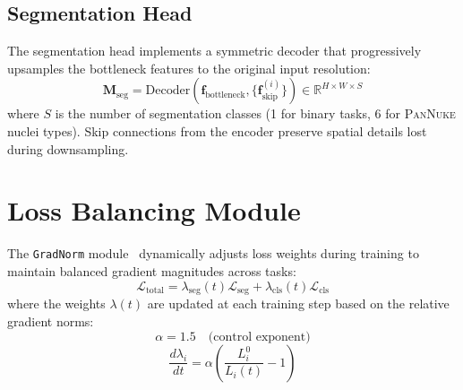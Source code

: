\documentclass[11pt,a4paper,twoside]{report}
\newcommand{\dataset}[1]{\textsc{#1}}
\newcommand{\model}[1]{\texttt{#1}}
\begin{document}
\subsection{Segmentation Head}

The segmentation head implements a symmetric decoder that progressively upsamples the bottleneck features to the original input resolution:
\begin{equation}
\mathbf{M}_{\text{seg}} = \text{Decoder}(\mathbf{f}_{\text{bottleneck}}, \{\mathbf{f}_{\text{skip}}^{(i)}\}) \in \mathbb{R}^{H \times W \times S}
\end{equation}
where $S$ is the number of segmentation classes (1 for binary tasks, 6 for \dataset{PanNuke} nuclei types). Skip connections from the encoder preserve spatial details lost during downsampling.

\section{Loss Balancing Module}

The \model{GradNorm} module~\cite{ding2024gradnorm} dynamically adjusts loss weights during training to maintain balanced gradient magnitudes across tasks:
\begin{equation}
\mathcal{L}_{\text{total}} = \lambda_{\text{seg}}(t) \mathcal{L}_{\text{seg}} + \lambda_{\text{cls}}(t) \mathcal{L}_{\text{cls}}
\end{equation}
where the weights $\lambda(t)$ are updated at each training step based on the relative gradient norms:
\begin{equation}
\alpha = 1.5 \quad \text{(control exponent)}
\end{equation}
\begin{equation}
\frac{d\lambda_i}{dt} = \alpha \left( \frac{L_i^0}{L_i(t)} - 1 \right)
\end{equation}
\end{document}
